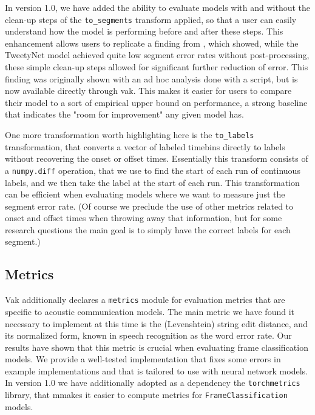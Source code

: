 In version 1.0,
we have added the ability to evaluate models
with and without the clean-up steps of the \texttt{to\_segments} transform applied,
so that a user can easily understand
how the model is performing before and after these steps.
This enhancement allows users to replicate a finding
from \cite{cohenAutomatedAnnotationBirdsong2022},
which showed, while the TweetyNet model achieved quite low segment error rates
without post-processing, these simple clean-up steps
allowed for significant further reduction of error.
This finding was originally shown with an ad hoc analysis done with a script,
but is now available directly through vak.
This makes it easier for users to compare their model
to a sort of empirical upper bound on performance,
a strong baseline that indicates
the "room for improvement" any given model has.

One more transformation worth highlighting here is the \texttt{to\_labels}
transformation, that converts a vector of labeled timebins directly
to labels without recovering the onset or offset times.
Essentially this transform consists of a \texttt{numpy.diff} operation,
that we use to find the start of each run of continuous labels,
and we then take the label at the start of each run.
This transformation can be efficient when evaluating models
where we want to measure just the segment error rate.
(Of course we preclude the use of other metrics related to onset and offset times
when throwing away that information, but for some research questions the main goal is to simply have the correct labels for each segment.)

\subsection{Metrics \label{subsec:metrics}}

Vak additionally declares a \texttt{metrics} module
for evaluation metrics that are specific to acoustic communication models.
The main metric we have found it necessary to implement at this time
is the (Levenshtein) string edit distance, and its normalized form,
known in speech recognition as the word error rate.
Our results have shown that this metric is crucial
when evaluating frame classification models.
We provide a well-tested implementation
that fixes some errors in example implementations
and that is tailored to use with neural network models.
In version 1.0 we have additionally adopted as a dependency the
\texttt{torchmetrics} library,
that mmakes it easier to compute metrics
for \texttt{FrameClassification} models.

